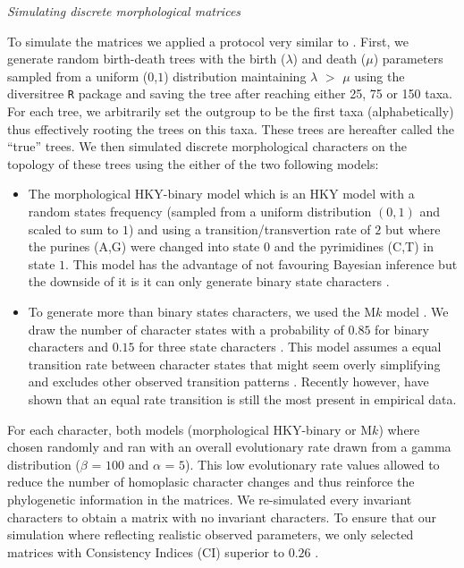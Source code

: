 \documentclass[12pt,letterpaper]{article}
\renewcommand{\subsection}[1]{%
\bigskip
\begin{center}
\begin{large}
\normalfont\itshape #1
\end{large}
\end{center}}
\begin{document}
\subsection{Simulating discrete morphological matrices}
To simulate the matrices we applied a protocol very similar to \citep{Guillerme2016146}.
First, we generate random birth-death trees with the birth ($\lambda$) and death ($\mu$) parameters sampled from a uniform ($0$,$1$) distribution maintaining $\lambda$ $>$ $\mu$ using the diversitree \texttt{R} package \citep[v0.9-8;][]{fitzjohndiversitree2012} and saving the tree after reaching either 25, 75 or 150 taxa.
For each tree, we arbitrarily set the outgroup to be the first taxa (alphabetically) thus effectively rooting the trees on this taxa.
These trees are hereafter called the ``true'' trees.
We then simulated discrete morphological characters on the topology of these trees using the either of the two following models:
\begin{itemize}
    \item The morphological HKY-binary model \citep{OReilly20160081} which is an HKY model \citep{HKY85} with a random states frequency (sampled from a uniform distribution $(0,1)$ and scaled to sum to $1$) and using a transition/transvertion rate of $2$ \citep{douadycomparison2003} but where the purines (A,G) were changed into state $0$ and the pyrimidines (C,T) in state $1$.
    This model has the advantage of not favouring Bayesian inference \citep[since it doesn't use a M$k$ model;][; see below]{OReilly20160081} but the downside of it is it can only generate binary state characters \citep[or 4 states;][]{puttick2017uncertain}.
    \item To generate more than binary states characters, we used the M$k$ model \citep{lewisa2001}.
    We draw the number of character states with a probability of $0.85$ for binary characters and $0.15$ for three state characters \citep{Guillerme2016146}.
    This model assumes a equal transition rate between character states that might seem overly simplifying and excludes other observed transition patterns \citep[e.g. Dollo characters;][]{Dollo,wright2015came}.
    Recently however, \cite{Wright01072016} have shown that an equal rate transition is still the most present in empirical data.
\end{itemize}

\noindent For each character, both models (morphological HKY-binary or M$k$) where chosen randomly and ran with an overall evolutionary rate drawn from a gamma distribution ($\beta$ = $100$ and $\alpha$ = $5$).
This low evolutionary rate values allowed to reduce the number of homoplasic character changes and thus reinforce the phylogenetic information in the matrices.
We re-simulated every invariant characters to obtain a matrix with no invariant characters.
To ensure that our simulation where reflecting realistic observed parameters, we only selected matrices with Consistency Indices (CI) superior to $0.26$ \citep{OReilly20160081}.
\end{document}
